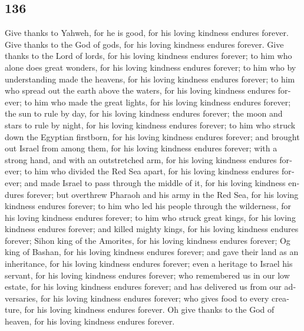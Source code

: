 \begin{paracol}{2}
\begin{otherlanguage}{english}
\hypertarget{section-271}{%
\section{136}\label{section-271}}

 Give thanks to Yahweh, for he is good, for his loving
kindness endures forever.  Give thanks to the God of gods,
for his loving kindness endures forever.  Give thanks to
the Lord of lords, for his loving kindness endures forever;
 to him who alone does great wonders, for his loving
kindness endures forever;  to him who by understanding
made the heavens, for his loving kindness endures forever;
 to him who spread out the earth above the waters, for his
loving kindness endures forever;  to him who made the
great lights, for his loving kindness endures forever; 
the sun to rule by day, for his loving kindness endures forever;
 the moon and stars to rule by night, for his loving
kindness endures forever;  to him who struck down the
Egyptian firstborn, for his loving kindness endures forever;
 and brought out Israel from among them, for his loving
kindness endures forever;  with a strong hand, and with
an outstretched arm, for his loving kindness endures forever;
 to him who divided the Red Sea apart, for his loving
kindness endures forever;  and made Israel to pass
through the middle of it, for his loving kindness endures forever;
 but overthrew Pharaoh and his army in the Red Sea, for
his loving kindness endures forever;  to him who led his
people through the wilderness, for his loving kindness endures forever;
 to him who struck great kings, for his loving kindness
endures forever;  and killed mighty kings, for his loving
kindness endures forever;  Sihon king of the Amorites,
for his loving kindness endures forever;  Og king of
Bashan, for his loving kindness endures forever;  and
gave their land as an inheritance, for his loving kindness endures
forever;  even a heritage to Israel his servant, for his
loving kindness endures forever;  who remembered us in
our low estate, for his loving kindness endures forever; 
and has delivered us from our adversaries, for his loving kindness
endures forever;  who gives food to every creature, for
his loving kindness endures forever.  Oh give thanks to
the God of heaven, for his loving kindness endures forever.


\end{otherlanguage}
\end{paracol}
